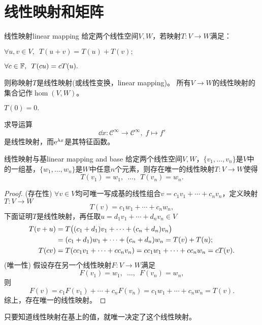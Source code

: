 \section{线性映射和矩阵}
\begin{definition}{线性映射}{linear mapping}
	给定两个线性空间$V,W$，若映射$T:V\to W$满足：
	\begin{compactenum}
		\item $\forall u,v\in V,\enspace T(u+v)=T(u)+T(v);$
		\item $\forall c\in\mathbb F,\enspace T(cu)=cT(u).$
	\end{compactenum}
	则称映射$T$是线性映射(或线性变换，linear mapping)。
	所有$V\to W$的线性映射的集合记作$\hom(V,W)$。
\end{definition}
\begin{corollary}
	$T(0)=0.$
\end{corollary}
\begin{example}
	{}{}
	求导运算
	\[
		\dd x:\mathcal C^\infty\to\mathcal C^\infty,\; f\mapsto f'
	\]
	是线性映射，而$\mathop{}\!\mathrm{e}^{\lambda x}$是其特征函数。
\end{example}
\begin{theorem}{线性映射与基}{linear mapping and base}
	给定两个线性空间$V,W$，$\{v_1,\ldots,v_n\}$是$V$中的一组基，$\{w_1,\ldots,w_n\}$是$W$中任意$n$个元素，则存在唯一的线性映射$T:V\to W$使得
	\[
		T(v_1)=w_1,\enspace\ldots,\enspace T(v_n)=w_n.
	\]
\end{theorem}
\begin{proof}
	(存在性) $\forall v\in V$均可唯一写成基的线性组合$v=c_1v_1+\cdots+c_nv_n$，定义映射$T:V\to W$
	\[
		T(v)=c_1w_1+\cdots+c_nw_n,
	\]
	下面证明$T$是线性映射，再任取$u=d_1v_1+\cdots+d_nv_n\in V$
	\begin{align*}
		T(v+u)&=T\bigl((c_1+d_1)v_1+\cdots+(c_n+d_n)v_n\bigr)\\
		&=(c_1+d_1)w_1+\cdots+(c_n+d_n)w_n=T(v)+T(u);\\
		T(cv)&=T(cc_1v_1+\cdots+cc_nv_n)=cc_1w_1+\cdots+cc_nw_n=cT(v).
	\end{align*}
	(唯一性) 假设存在另一个线性映射$F:V\to W$满足
	\[
		F(v_1)=w_1,\enspace\ldots,\enspace F(v_n)=w_n,
	\]
	则 
	\[
		F(v)=c_1F(v_1)+\cdots+c_nF(v_n)=c_1w_1+\cdots+c_nw_n=T(v).
	\]
	综上，存在唯一的线性映射。
\end{proof}

\begin{remark}
	只要知道线性映射在基上的值，就唯一决定了这个线性映射。
\end{remark}

